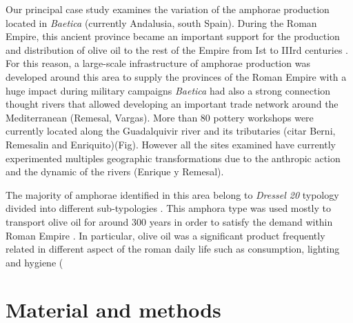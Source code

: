 \documentclass[review]{elsarticle}
\begin{document}
Our principal case study examines the variation of the amphorae production located in \emph{Baetica} (currently Andalusia, south Spain). During the Roman Empire, this ancient province became an important support for the production and distribution of  olive oil to the rest of the Empire from Ist to IIIrd centuries \cite{rodriguez_baetican_1998}. For this reason, a large-scale infrastructure of amphorae production was developed around this area to supply the provinces of the Roman Empire with a huge impact during military campaigns \citep{monfort_britannia_1998}
\emph{Baetica} had also a strong connection thought rivers that allowed developing an important trade network around the Mediterranean (Remesal, Vargas). More than 80 pottery workshops were currently located along the Guadalquivir river and its tributaries (citar Berni, Remesalin and Enriquito)(Fig). However all the sites examined have currently experimented multiples geographic transformations due to the anthropic action and the dynamic of the rivers (Enrique y Remesal). 


The majority of amphorae identified in this area belong to \emph{Dressel 20} typology divided into different sub-typologies \citep{berni_millet_epigrafianforica_2008, martin-kilcher_romischen_1994}. This amphora type was used mostly to transport olive oil for around 300 years in order to satisfy the demand within Roman Empire \citep{rodriguez_economioleicola_1977}. In particular, olive oil was a significant product frequently related in different aspect of the roman daily life such as consumption, lighting and hygiene (%




\section{Material and methods}
\end{document}
